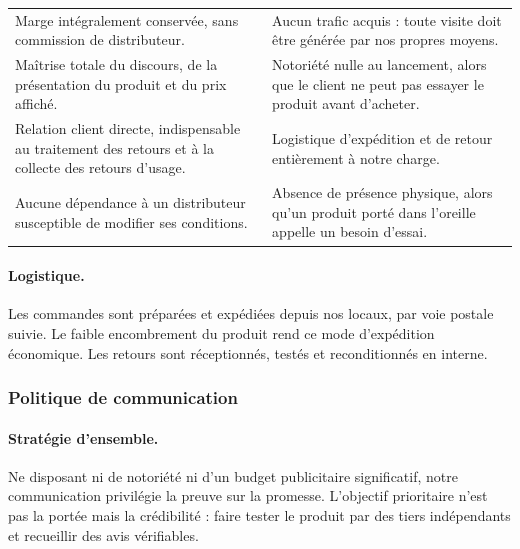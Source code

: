 \begin{center}
\begin{tabularx}{\textwidth}{LL}
\toprule
{} &  \\
\midrule
Marge intégralement conservée, sans commission de distributeur.
&
Aucun trafic acquis : toute visite doit être générée par nos propres moyens. \\
Maîtrise totale du discours, de la présentation du produit et du prix affiché.
&
Notoriété nulle au lancement, alors que le client ne peut pas essayer le produit
avant d'acheter. \\
Relation client directe, indispensable au traitement des retours et à la
collecte des retours d'usage.
&
Logistique d'expédition et de retour entièrement à notre charge. \\
Aucune dépendance à un distributeur susceptible de modifier ses conditions.
&
Absence de présence physique, alors qu'un produit porté dans l'oreille appelle
un besoin d'essai. \\
\bottomrule
\end{tabularx}
\end{center}

\paragraph{Logistique.}
Les commandes sont préparées et expédiées depuis nos locaux, par voie postale
suivie. Le faible encombrement du produit rend ce mode d'expédition économique.
Les retours sont réceptionnés, testés et reconditionnés en interne.

\subsubsection{Politique de communication}

\paragraph{Stratégie d'ensemble.}
Ne disposant ni de notoriété ni d'un budget publicitaire significatif, notre
communication privilégie la preuve sur la promesse. L'objectif prioritaire n'est
pas la portée mais la crédibilité : faire tester le produit par des tiers
indépendants et recueillir des avis vérifiables.

